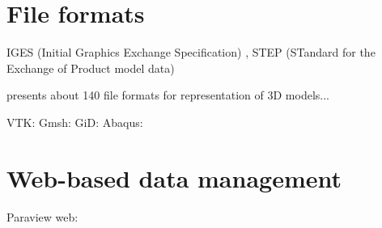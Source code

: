 \section{File formats}
IGES (Initial Graphics Exchange Specification) \cite{Groton2006}, STEP (STandard for the Exchange of Product model data) \cite{Pratt2001}



\cite{OpenCASCADE}

\cite{Abaqus}

\cite{McHenry2008}  presents about 140 file formats for representation of 3D models...








VTK: \cite{VTK2015}
Gmsh: \cite{Geuzaine2009}
GiD: \cite{GiDPostProcess}
Abaqus: 
\newline
\cite{Ivanyi2012}


\section{Web-based data management}

\cite{Ari2013}
\cite{Yu2010}
\cite{Peng2003}
\cite{Heber2007I}
\cite{Heber2007II}
\cite{Weng2011}
\cite{Chen2008}

Paraview web: \cite{Jourdain2011}

